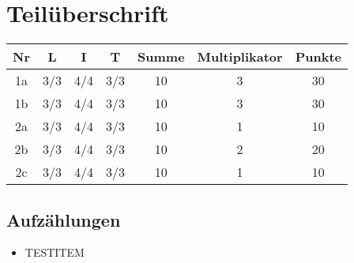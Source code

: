 \section{Teilüberschrift}


\begin{table}[!htp]
  \centering
  \begin{tabular}{|c|c|c|c|c|c|c|}
  \hline
  \textbf{Nr} & \textbf{L} & \textbf{I} & \textbf{T} & \textbf{Summe} & \textbf{Multiplikator} & \textbf{Punkte} \\ \hline
  1a          & 3/3        & 4/4        & 3/3        & 10             & 3                      & 30              \\ \hline
  1b          & 3/3        & 4/4        & 3/3        & 10             & 3                      & 30              \\ \hline
  2a          & 3/3        & 4/4        & 3/3        & 10             & 1                      & 10              \\ \hline
  2b          & 3/3        & 4/4        & 3/3        & 10             & 2                      & 20              \\ \hline
  2c          & 3/3        & 4/4        & 3/3        & 10             & 1                      & 10              \\ \hline
  \end{tabular}
\end{table}

\subsection{Aufzählungen}
\begin{itemize}
  \item TESTITEM
\end{itemize}

%
%
%



